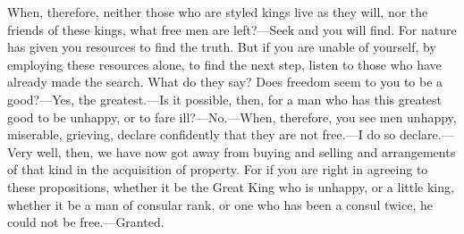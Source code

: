 When, therefore, neither those who are styled kings live as they will, nor the friends of these kings, what free men are left?—Seek and you will find. For nature has given you resources to find the truth. But if you are unable of yourself, by employing these resources alone, to find the next step, listen to those who have already made the search. What do they say? Does freedom seem to you to be a good?—Yes, the greatest.—Is it possible, then, for a man who has this greatest good to be unhappy, or to fare ill?—No.—When, therefore, you see men unhappy, miserable, grieving, declare confidently that they are not free.—I do so declare.—Very well, then, we have now got away from buying and selling and arrangements of that kind in the acquisition of property. For if you are right in agreeing to these propositions, whether it be the Great King who is unhappy, or a little king, whether it be a man of consular rank, or one who has been a consul twice, he could not be free.—Granted.

